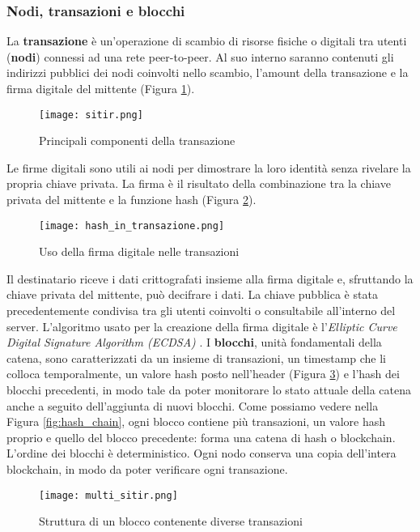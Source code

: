 \subsubsection{Nodi, transazioni e blocchi}
La \textbf{transazione} è un'operazione di scambio di risorse fisiche o digitali tra utenti (\textbf{nodi}) connessi ad una rete peer-to-peer. Al suo interno saranno contenuti gli indirizzi pubblici dei nodi coinvolti nello scambio, l'amount della transazione e la firma digitale del mittente (Figura \ref{fig:sitir}).

\begin{figure}[htbp]
  \centering
  \texttt{[image: sitir.png]}
  \caption{Principali componenti della transazione}
  \label{fig:sitir}
\end{figure}

Le firme digitali sono utili ai nodi per dimostrare la loro identità senza rivelare la propria chiave privata. La firma è il risultato della combinazione tra la chiave privata del mittente e la funzione hash (Figura \ref{fig:hash_in_transazione}).

\begin{figure}[htbp]
  \centering
  \texttt{[image: hash\_in\_transazione.png]}
  \caption{Uso della firma digitale nelle transazioni}
  \label{fig:hash_in_transazione}
\end{figure}

Il destinatario riceve i dati crittografati insieme alla firma digitale e, sfruttando la chiave privata del mittente, può decifrare i dati. La chiave pubblica è stata precedentemente condivisa tra gli utenti coinvolti o consultabile all'interno del server. L'algoritmo usato per la creazione della firma digitale è l'\textit{Elliptic Curve Digital Signature Algorithm (ECDSA)} \cite{comparitech_2019}.
I \textbf{blocchi}, unità fondamentali della catena, sono caratterizzati da un insieme di transazioni, un timestamp che li colloca temporalmente, un valore hash posto nell'header (Figura \ref{fig:multi_sitir}) e l'hash dei blocchi precedenti, in modo tale da poter monitorare lo stato attuale della catena anche a seguito dell'aggiunta di nuovi blocchi. Come possiamo vedere nella Figura \ref{fig:hash_chain}, ogni blocco contiene più transazioni, un valore hash proprio e quello del blocco precedente: forma una catena di hash o blockchain. L'ordine dei blocchi è deterministico. Ogni nodo conserva una copia dell'intera blockchain, in modo da poter verificare ogni transazione.

\begin{figure}[htbp]
  \centering
  \texttt{[image: multi\_sitir.png]}
  \caption{Struttura di un blocco contenente diverse transazioni}
  \label{fig:multi_sitir}
\end{figure}

